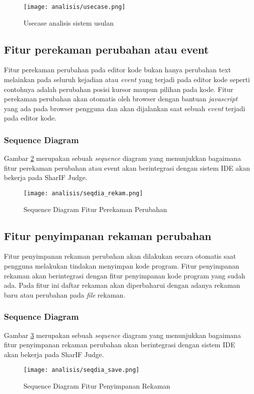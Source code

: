 \begin{figure}[H]
	\centering
	\texttt{[image: analisis/usecase.png]}
	\caption{Usecase analisis sistem usulan}
	\label{fig:3:usecase}
\end{figure}

\subsection{Fitur perekaman perubahan atau event}
\label{sub:3:2:rekam}
Fitur perekaman perubahan pada editor kode bukan hanya perubahan text melainkan pada seluruh kejadian atau \textit{event} yang terjadi pada editor kode seperti contohnya adalah perubahan posisi kursor maupun pilihan pada kode. Fitur perekaman perubahan akan otomatis oleh browser dengan bantuan \textit{javascript} yang ada pada browser pengguna dan akan dijalankan saat sebuah \textit{event} terjadi pada editor kode.

\subsubsection{Sequence Diagram}
Gambar \ref{fig:3:2:seqdia_rekam} merupakan sebuah \textit{sequence} diagram yang menunjukkan bagaimana fitur perekaman perubahan atau event akan berintegrasi dengan sistem IDE akan bekerja pada SharIF Judge.
\begin{figure}[H]
	\centering
	\texttt{[image: analisis/seqdia\_rekam.png]}
	\caption{Sequence Diagram Fitur Perekaman Perubahan}
	\label{fig:3:2:seqdia_rekam}
\end{figure}

\subsection{Fitur penyimpanan rekaman perubahan}
\label{sub:3:2:save}
Fitur penyimpanan rekaman perubahan akan dilakukan secara otomatis saat pengguna melakukan tindakan menyimpan kode program. Fitur penyimpanan rekaman akan berintegrasi dengan fitur penyimpanan kode program yang sudah ada. Pada fitur ini daftar rekaman akan diperbaharui dengan adanya rekaman baru atau perubahan pada \textit{file} rekaman.

\subsubsection{Sequence Diagram}
Gambar \ref{fig:3:2:seqdia_save} merupakan sebuah \textit{sequence} diagram yang menunjukkan bagaimana fitur penyimpanan rekaman perubahan akan berintegrasi dengan sistem IDE akan bekerja pada SharIF Judge.
\begin{figure}[H]
	\centering
	\texttt{[image: analisis/seqdia\_save.png]}
	\caption{Sequence Diagram Fitur Penyimpanan Rekaman}
	\label{fig:3:2:seqdia_save}
\end{figure}

